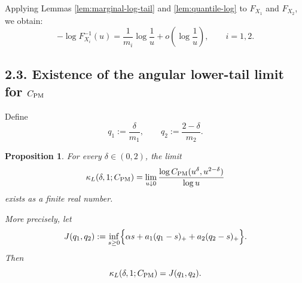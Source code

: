 \documentclass[11pt]{article}
\newtheorem{proposition}[theorem]{Proposition}
\begin{document}
Applying Lemmas \ref{lem:marginal-log-tail} and \ref{lem:quantile-log} to $F_{X_1}$ and $F_{X_2}$, we obtain:
\begin{equation}\label{eq:quantile-asymptotics}
-\log F_{X_i}^{-1}(u)
=
\frac{1}{m_i}\log\!\frac{1}{u}
+
o\!\left(\log\!\frac{1}{u}\right),
\qquad i=1,2.
\end{equation}

\subsection*{2.3. Existence of the angular lower-tail limit for $C_{\rm PM}$}

Define
\[
q_1:=\frac{\delta}{m_1},
\qquad
q_2:=\frac{2-\delta}{m_2}.
\]

\begin{proposition}\label{prop:PM-existence}
For every $\delta\in(0,2)$, the limit
\[
\kappa_L(\delta,1;C_{\rm PM})
=
\lim_{u\downarrow 0}
\frac{\log C_{\rm PM}(u^\delta,u^{2-\delta})}{\log u}
\]
exists as a finite real number.

More precisely, let
\[
J(q_1,q_2)
:=
\inf_{s\ge 0}
\Bigl\{
\alpha s
+
a_1(q_1-s)_+
+
a_2(q_2-s)_+
\Bigr\}.
\]
Then
\[
\kappa_L(\delta,1;C_{\rm PM}) = J(q_1,q_2).
\]
\end{proposition}
\end{document}
